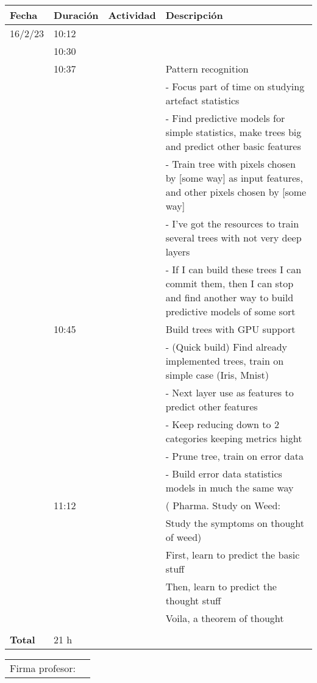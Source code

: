 \documentclass[12pt,oneside]{book}
\begin{document}
  \begin{table} [!h]
    \centering
    \begin{tabular}{p{1.5 cm} p{1.7 cm} p{5 cm} p{8 cm}}
      \hline
      Fecha & Duración & Actividad & Descripción \\
      \hline
      16/2/23 & 10:12 & & \\
      & 10:30 & & \\
      & 10:37 & & Pattern recognition \\
      & & & - Focus part of time on studying artefact statistics \\
      & & & - Find predictive models for simple statistics, make trees big and predict other basic features \\
      & & & - Train tree with pixels chosen by [some way] as input features, and
                other pixels chosen by [some way] \\
      & & & - I've got the resources
                to train several trees with not very deep layers \\
      & & & - If I can build these trees I can commit them,
                then I can stop and find another way to build predictive models
                of some sort \\
      & 10:45 & & Build trees with GPU support \\
      & & & - (Quick build) Find already implemented trees, train on simple case
                                                                   (Iris, Mnist) \\
      & & & - Next layer use as features to predict other features \\
      & & & - Keep reducing down to 2 categories keeping metrics hight \\
      & & & - Prune tree, train on error data \\
      & & & - Build error data statistics models in much the same way \\
      & 11:12 & & ( Pharma. Study on Weed: \\
      & & & Study the symptoms on thought of weed) \\
      & & & First, learn to predict the basic stuff \\
      & & & Then, learn to predict the thought stuff \\
      & & & Voila, a theorem of thought \\
      & & & \\
      \hline
      \textbf{Total} & 21 h \\
      \hline
    \end{tabular}
  \end{table}
  
  \vfill

  \begin{tabular}{p{3 cm} p{10 cm}}
    Firma profesor: & \\
    \cline{2-2}
  \end{tabular}

  \printbibliography[title={Bibliografía},heading=bibintoc]
\end{document}
